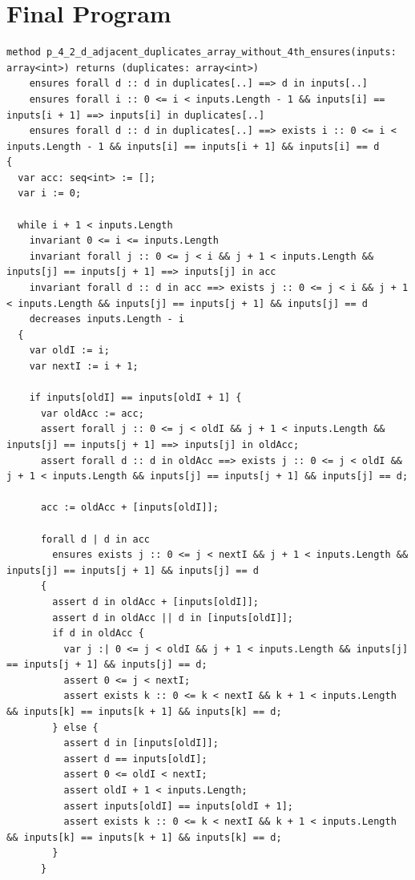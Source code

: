 \documentclass{article}
\begin{document}
\section*{Final Program}
\begin{lstlisting}
method p_4_2_d_adjacent_duplicates_array_without_4th_ensures(inputs: array<int>) returns (duplicates: array<int>)
	ensures forall d :: d in duplicates[..] ==> d in inputs[..]
	ensures forall i :: 0 <= i < inputs.Length - 1 && inputs[i] == inputs[i + 1] ==> inputs[i] in duplicates[..]
	ensures forall d :: d in duplicates[..] ==> exists i :: 0 <= i < inputs.Length - 1 && inputs[i] == inputs[i + 1] && inputs[i] == d
{
  var acc: seq<int> := [];
  var i := 0;

  while i + 1 < inputs.Length
    invariant 0 <= i <= inputs.Length
    invariant forall j :: 0 <= j < i && j + 1 < inputs.Length && inputs[j] == inputs[j + 1] ==> inputs[j] in acc
    invariant forall d :: d in acc ==> exists j :: 0 <= j < i && j + 1 < inputs.Length && inputs[j] == inputs[j + 1] && inputs[j] == d
    decreases inputs.Length - i
  {
    var oldI := i;
    var nextI := i + 1;

    if inputs[oldI] == inputs[oldI + 1] {
      var oldAcc := acc;
      assert forall j :: 0 <= j < oldI && j + 1 < inputs.Length && inputs[j] == inputs[j + 1] ==> inputs[j] in oldAcc;
      assert forall d :: d in oldAcc ==> exists j :: 0 <= j < oldI && j + 1 < inputs.Length && inputs[j] == inputs[j + 1] && inputs[j] == d;

      acc := oldAcc + [inputs[oldI]];

      forall d | d in acc
        ensures exists j :: 0 <= j < nextI && j + 1 < inputs.Length && inputs[j] == inputs[j + 1] && inputs[j] == d
      {
        assert d in oldAcc + [inputs[oldI]];
        assert d in oldAcc || d in [inputs[oldI]];
        if d in oldAcc {
          var j :| 0 <= j < oldI && j + 1 < inputs.Length && inputs[j] == inputs[j + 1] && inputs[j] == d;
          assert 0 <= j < nextI;
          assert exists k :: 0 <= k < nextI && k + 1 < inputs.Length && inputs[k] == inputs[k + 1] && inputs[k] == d;
        } else {
          assert d in [inputs[oldI]];
          assert d == inputs[oldI];
          assert 0 <= oldI < nextI;
          assert oldI + 1 < inputs.Length;
          assert inputs[oldI] == inputs[oldI + 1];
          assert exists k :: 0 <= k < nextI && k + 1 < inputs.Length && inputs[k] == inputs[k + 1] && inputs[k] == d;
        }
      }


\end{lstlisting}
\end{document}
